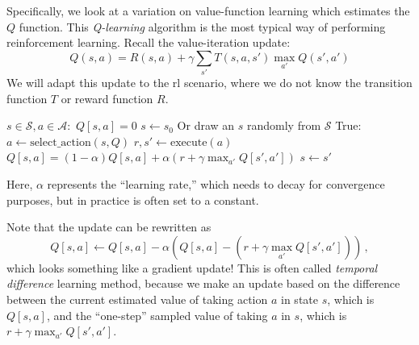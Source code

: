 %
Specifically, we look at a variation on value-function learning which
estimates the $Q$ function.  This {\em Q-learning} algorithm is the
most typical way of performing reinforcement learning.  Recall the
value-iteration update:
\begin{equation}
 Q(s,a) = R(s,a) + \gamma \sum_{s'} T(s,a,s')\max_{a'}Q(s',a')
\end{equation}
We will adapt this update to the {\sc rl} scenario, where we do not
know the transition function $T$ or reward function $R$.
\begin{codebox}
  \li \For $s \in \mathcal{S}, a \in \mathcal{A}:$
  \li   \Do
          $Q[s, a] = 0$
        \End
  \li $s \gets s_0$ \Comment Or draw an $s$ randomly from $\mathcal S$
  \li \While True:
  \li   \Do
          $a \gets \text{select}\_\text{action}(s, Q)$
  \li     $r,s' \gets \text{execute}(a)$
  \li     $Q[s, a] = (1-\alpha)Q[s, a]
          + \alpha(r + \gamma \max_{a'}Q[s',a'])$
  \li     $s \gets s'$
\end{codebox}
Here, $\alpha$ represents the ``learning rate,'' which needs to decay
for convergence purposes, but in practice is often set to a
constant. 

Note that the update can be rewritten as
\begin{equation}
Q[s, a] \gets Q[s, a]
    - \alpha\left(Q[s,a] - (r + \gamma \max_{a'}
    Q[s',a'])\right)\,,
\end{equation}
which looks something like a gradient update!  
This is often called {\em temporal difference} learning method,
because we make an update based on the difference between the
current estimated value of taking action $a$ in state $s$, which is
$Q[s, a]$, and the ``one-step'' sampled value of taking $a$ in $s$,
which is $r + \gamma \max_{a'}  Q[s',a']$.

